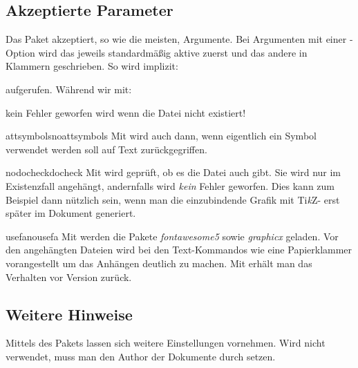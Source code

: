 \documentclass{sopra-base}
\begin{document}
\subsection{Akzeptierte Parameter}
    Das Paket akzeptiert, so wie die meisten, Argumente.
    Bei Argumenten mit einer -Option wird das jeweils standardmäßig aktive zuerst und das andere in Klammern
    geschrieben. So wird implizit:
\begin{plainlatex}
    \usepackage[attsymbols,nodocheck,usefa]{sopra-attachments}
\end{plainlatex}
    aufgerufen. Während wir mit:
\begin{plainlatex}
    \usepackage[docheck]{sopra-attachments}
\end{plainlatex}
    kein Fehler geworfen wird wenn die Datei nicht existiert!

    \begin{argument}{attsymbols}{noattsymbols}
        Mit  wird auch dann, wenn eigentlich ein Symbol verwendet werden
        soll auf Text zurückgegriffen.
    \end{argument}

    \begin{argument}{nodocheck}{docheck}
        Mit  wird geprüft, ob es die Datei auch gibt. Sie wird nur im Existenzfall
        angehängt, andernfalls wird \emph{kein} Fehler geworfen. Dies kann zum Beispiel dann
        nützlich sein, wenn man die einzubindende Grafik mit Ti\textit{k}Z- erst
        später im Dokument generiert.
    \end{argument}

    \begin{argument}{usefa}{nousefa}
        Mit  werden die Pakete \emph{fontawesome5} sowie \emph{graphicx} geladen. Vor den angehängten Dateien wird bei den Text-Kommandos wie  eine Papierklammer vorangestellt um das Anhängen deutlich zu machen. Mit  erhält man das Verhalten vor Version  zurück.
    \end{argument}

\subsection{Weitere Hinweise}

    Mittels  des Pakets  lassen sich weitere
    Einstellungen vornehmen. Wird nicht  verwendet, muss man den Author
    der Dokumente durch  setzen.
\end{document}
